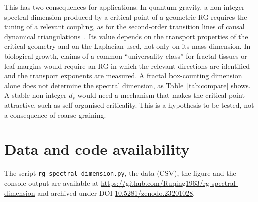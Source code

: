\documentclass[11pt]{article}
\theoremstyle{remark}\newtheorem*{remark}{Remark}
\newcommand{\paperdoi}{10.5281/zenodo.23201028}
\begin{document}
This has two consequences for applications. In quantum gravity, a non-integer spectral dimension produced by a
critical point of a geometric RG requires the tuning of a relevant coupling, as for the second-order transition lines
of causal dynamical triangulations~\cite{AJL}. Its value depends on the transport properties of the critical geometry
and on the Laplacian used, not only on its mass dimension. In biological growth, claims of a common ``universality
class'' for fractal tissues or leaf margins would require an RG in which the relevant directions are identified and
the transport exponents are measured. A fractal box-counting dimension alone does not determine the spectral
dimension, as Table~\ref{tab:compare} shows. A stable non-integer $d_s$ would need a mechanism that makes the critical
point attractive, such as self-organised criticality. This is a hypothesis to be tested, not a consequence of
coarse-graining.

\section*{Data and code availability}
The script \texttt{rg\_spectral\_dimension.py}, the data (CSV), the figure and the console output are available at
\url{https://github.com/Ruqing1963/rg-spectral-dimension} and archived under DOI \href{https://doi.org/\paperdoi}{\paperdoi}.
\end{document}
